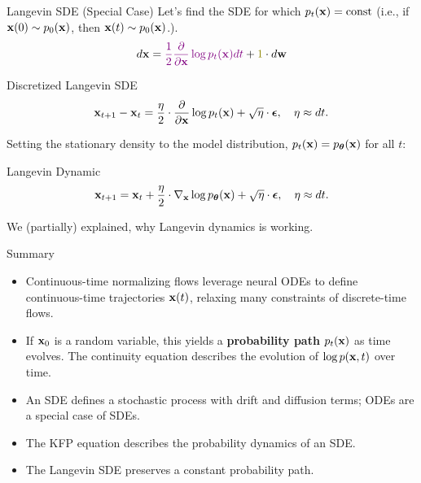 \documentclass{beamer}
\begin{document}
\begin{frame}{Langevin SDE (Special Case)}
	Let's find the SDE for which $p_t(\mathbf{x}) = \text{const}$ (i.e., if $\mathbf{x}(0) \sim p_0(\mathbf{x})$, then $\mathbf{x}(t) \sim p_0(\mathbf{x})$.).
	\[
		d \bx = {\color{violet}\frac{1}{2} \frac{\partial}{\partial \bx} \log p_t(\bx) d t} + {\color{olive}1} \cdot d \bw
	\]
	\eqpause
	\begin{block}{Discretized Langevin SDE}
		\vspace{-0.3cm}
		\[
			\mathbf{x}_{t + 1} - \mathbf{x}_t = \frac{\eta}{2} \cdot \frac{\partial}{\partial \mathbf{x}} \log p_t(\mathbf{x}) + \sqrt{\eta} \cdot \boldsymbol{\epsilon}, \quad \eta \approx dt.
		\]
		\vspace{-0.4cm}
	\end{block}
	\eqpause
	Setting the stationary density to the model distribution, $p_t(\mathbf{x}) = p_{\boldsymbol{\theta}}(\mathbf{x})$ for all $t$:
	\begin{block}{Langevin Dynamic}
		\vspace{-0.3cm}
		\[
			\mathbf{x}_{t + 1} = \mathbf{x}_t + \frac{\eta}{2} \cdot \nabla_{\mathbf{x}} \log p_{\boldsymbol{\theta}}(\mathbf{x}) + \sqrt{\eta} \cdot \boldsymbol{\epsilon}, \quad \eta \approx dt.
		\]
		\vspace{-0.3cm}
	\end{block}
	We (partially) explained, why Langevin dynamics is working.
\end{frame}
\begin{frame}{Summary}
	\begin{itemize}
		\item Continuous-time normalizing flows leverage neural ODEs to define continuous-time trajectories $\mathbf{x}(t)$, relaxing many constraints of discrete-time flows.
		\vfill
		\item If $\mathbf{x}_0$ is a random variable, this yields a \textbf{probability path} $p_t(\mathbf{x})$ as time evolves. The continuity equation describes the evolution of $\log p(\mathbf{x}, t)$ over time.
		\vfill
		\item An SDE defines a stochastic process with drift and diffusion terms; ODEs are a special case of SDEs.
		\vfill
		\item The KFP equation describes the probability dynamics of an SDE.
		\vfill
		\item The Langevin SDE preserves a constant probability path.
	\end{itemize}
\end{frame}
\end{document}
